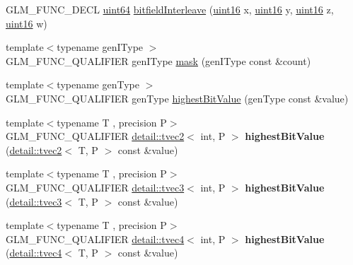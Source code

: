 \begin{DoxyCompactItemize}
\item 
G\+L\+M\+\_\+\+F\+U\+N\+C\+\_\+\+D\+E\+CL \hyperlink{group__gtc__type__precision_gae3632bf9b37da66233d78930dd06378a}{uint64} \hyperlink{group__gtx__bit_gac8a926a7bfd9b23c22a4f685193fbfe1}{bitfield\+Interleave} (\hyperlink{group__gtc__type__precision_gad8c2939e1fdd8e5828b31d95c52255d5}{uint16} x, \hyperlink{group__gtc__type__precision_gad8c2939e1fdd8e5828b31d95c52255d5}{uint16} y, \hyperlink{group__gtc__type__precision_gad8c2939e1fdd8e5828b31d95c52255d5}{uint16} z, \hyperlink{group__gtc__type__precision_gad8c2939e1fdd8e5828b31d95c52255d5}{uint16} w)
\item 
{\footnotesize template$<$typename gen\+I\+Type $>$ }\\G\+L\+M\+\_\+\+F\+U\+N\+C\+\_\+\+Q\+U\+A\+L\+I\+F\+I\+ER gen\+I\+Type \hyperlink{group__gtx__bit_ga79f1482a09c91f785e7e0ea8aed2b20e}{mask} (gen\+I\+Type const \&count)
\item 
{\footnotesize template$<$typename gen\+Type $>$ }\\G\+L\+M\+\_\+\+F\+U\+N\+C\+\_\+\+Q\+U\+A\+L\+I\+F\+I\+ER gen\+Type \hyperlink{group__gtx__bit_ga9621840252c293918780bc3890374b86}{highest\+Bit\+Value} (gen\+Type const \&value)
\item 
{\footnotesize template$<$typename T , precision P$>$ }\\G\+L\+M\+\_\+\+F\+U\+N\+C\+\_\+\+Q\+U\+A\+L\+I\+F\+I\+ER \hyperlink{structglm_1_1detail_1_1tvec2}{detail\+::tvec2}$<$ int, P $>$ {\bfseries highest\+Bit\+Value} (\hyperlink{structglm_1_1detail_1_1tvec2}{detail\+::tvec2}$<$ T, P $>$ const \&value)\hypertarget{namespaceglm_a4f75fd8e2634dcbac5c81ecb1f40a5be}{}\label{namespaceglm_a4f75fd8e2634dcbac5c81ecb1f40a5be}

\item 
{\footnotesize template$<$typename T , precision P$>$ }\\G\+L\+M\+\_\+\+F\+U\+N\+C\+\_\+\+Q\+U\+A\+L\+I\+F\+I\+ER \hyperlink{structglm_1_1detail_1_1tvec3}{detail\+::tvec3}$<$ int, P $>$ {\bfseries highest\+Bit\+Value} (\hyperlink{structglm_1_1detail_1_1tvec3}{detail\+::tvec3}$<$ T, P $>$ const \&value)\hypertarget{namespaceglm_a3cc0f5abbbb75eaed77259e59e64c601}{}\label{namespaceglm_a3cc0f5abbbb75eaed77259e59e64c601}

\item 
{\footnotesize template$<$typename T , precision P$>$ }\\G\+L\+M\+\_\+\+F\+U\+N\+C\+\_\+\+Q\+U\+A\+L\+I\+F\+I\+ER \hyperlink{structglm_1_1detail_1_1tvec4}{detail\+::tvec4}$<$ int, P $>$ {\bfseries highest\+Bit\+Value} (\hyperlink{structglm_1_1detail_1_1tvec4}{detail\+::tvec4}$<$ T, P $>$ const \&value)\hypertarget{namespaceglm_a89cb0ee8fe4da392e1b3662512bee20d}{}\label{namespaceglm_a89cb0ee8fe4da392e1b3662512bee20d}


\end{DoxyCompactItemize}

